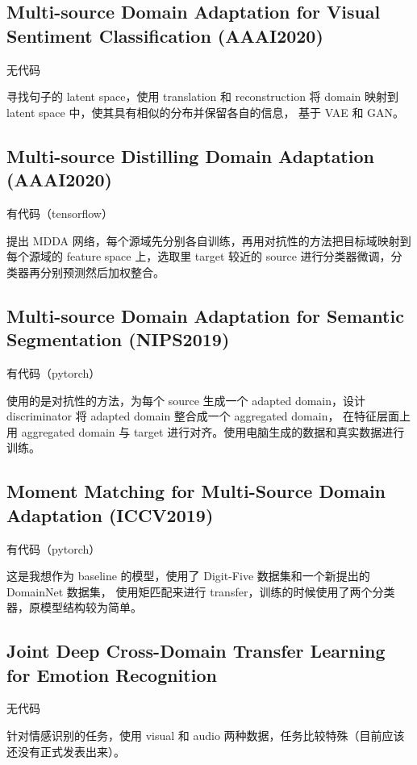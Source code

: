 \documentclass[UTF8]{ctexart}
\begin{document}
\subsection{Multi-source Domain Adaptation for Visual Sentiment Classification (AAAI2020)}

无代码

寻找句子的 latent space，使用 translation 和 reconstruction 将 domain 映射到 latent space 中，使其具有相似的分布并保留各自的信息，
基于 VAE 和 GAN。

\subsection{Multi-source Distilling Domain Adaptation (AAAI2020)}

有代码（tensorflow）

提出 MDDA 网络，每个源域先分别各自训练，再用对抗性的方法把目标域映射到每个源域的 feature space 上，选取里 target 较近的 source 进行分类器微调，分类器再分别预测然后加权整合。

\subsection{Multi-source Domain Adaptation for Semantic Segmentation (NIPS2019)}

有代码（pytorch）

使用的是对抗性的方法，为每个 source 生成一个 adapted domain，设计 discriminator 将 adapted domain 整合成一个 aggregated domain，
在特征层面上用 aggregated domain 与 target 进行对齐。使用电脑生成的数据和真实数据进行训练。

\subsection{Moment Matching for Multi-Source Domain Adaptation (ICCV2019)}

有代码（pytorch）

这是我想作为 baseline 的模型，使用了 Digit-Five 数据集和一个新提出的 DomainNet 数据集，
使用矩匹配来进行 transfer，训练的时候使用了两个分类器，原模型结构较为简单。

\subsection{Joint Deep Cross-Domain Transfer Learning for Emotion Recognition}

无代码

针对情感识别的任务，使用 visual 和 audio 两种数据，任务比较特殊（目前应该还没有正式发表出来）。
\end{document}
